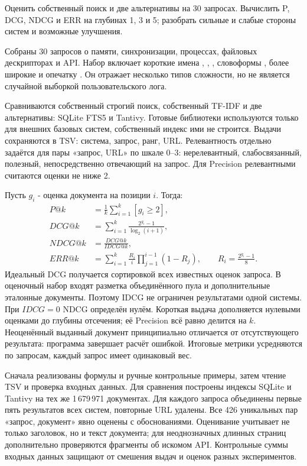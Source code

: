 \task
Оценить собственный поиск и две альтернативы на 30 запросах.
Вычислить P, DCG, NDCG и ERR на глубинах 1, 3 и 5; разобрать сильные
и слабые стороны систем и возможные улучшения.

\method
Собраны 30 запросов о памяти, синхронизации, процессах, файловых
дескрипторах и API. Набор включает короткие имена ,
, , словоформы
, более широкие
 и опечатку . Он отражает несколько
типов сложности, но не является случайной выборкой пользовательского лога.

Сравниваются собственный строгий поиск, собственный TF-IDF и две
альтернативы: SQLite FTS5 и Tantivy. Готовые библиотеки используются
только для внешних базовых систем, собственный индекс ими не строится.
Выдачи сохраняются в TSV: система, запрос, ранг, URL. Релевантность
отдельно задаётся для пары «запрос, URL» по шкале 0--3: нерелевантный,
слабосвязанный, полезный, непосредственно отвечающий на запрос.
Для Precision релевантными считаются оценки не ниже 2.

Пусть \(g_i\) - оценка документа на позиции \(i\). Тогда:
\begin{align*}
P@k&=\frac1k\sum_{i=1}^{k}[g_i\ge2],\\
DCG@k&=\sum_{i=1}^{k}\frac{2^{g_i}-1}{\log_2(i+1)},\\
NDCG@k&=\frac{DCG@k}{IDCG@k},\\
ERR@k&=\sum_{i=1}^{k}\frac{R_i}{i}\prod_{j=1}^{i-1}(1-R_j),
\qquad R_i=\frac{2^{g_i}-1}{8}.
\end{align*}
Идеальный DCG получается сортировкой всех известных оценок запроса.
В оценочный набор входят разметка объединённого пула и дополнительные
эталонные документы. Поэтому IDCG не ограничен результатами одной системы.
При \(IDCG=0\) NDCG определён нулём. Короткая выдача дополняется
нулевыми оценками до глубины отсечения; её Precision всё равно делится
на \(k\). Неоценённый выданный документ принципиально отличается
от отсутствующего результата: программа завершает расчёт ошибкой.
Итоговые метрики усредняются по запросам, каждый запрос имеет одинаковый вес.

\journal
Сначала реализованы формулы и ручные контрольные примеры, затем
чтение TSV и проверка входных данных. Для сравнения построены индексы
SQLite и Tantivy на тех же 1\,679\,971 документах. Для каждого запроса
объединены первые пять результатов всех систем, повторные URL удалены.
Все 426 уникальных пар «запрос, документ» явно оценены с обоснованиями.
Оценивание учитывает не только заголовок, но и текст документа;
для неоднозначных длинных страниц дополнительно проверяются фрагменты
об искомом API. Контрольные суммы входных данных защищают от смешения
выдач и оценок разных экспериментов.

